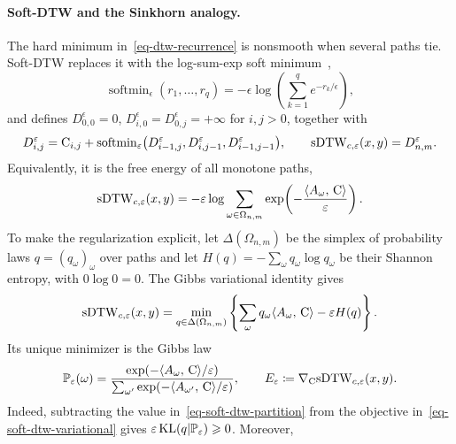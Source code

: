 \paragraph{Soft-DTW and the Sinkhorn analogy.}
The hard minimum in~\eqref{eq-dtw-recurrence} is nonsmooth when several paths tie. Soft-DTW replaces it with the log-sum-exp soft minimum~\cite{CuturiBlondel2017SoftDTW},
\begin{equation}\label{eq-dtw-softmin}
	\operatorname{softmin}_\epsilon(r_1,\ldots,r_q)
	=
	-\epsilon\log\!\left(\sum_{k=1}^q e^{-r_k/\epsilon}\right),
\end{equation}
and defines $D_{0,0}^\epsilon=0$, $D_{i,0}^\epsilon=D_{0,j}^\epsilon=+\infty$ for $i,j>0$, together with
\begin{equation}\label{eq-soft-dtw-recurrence}
	D_{i,j}^\varepsilon
	=
	\mathrm{C}_{i,j}
	+
	\operatorname{softmin}_\varepsilon
	\bigl(D_{i-1,j}^\varepsilon,D_{i,j-1}^\varepsilon,D_{i-1,j-1}^\varepsilon\bigr),
	\qquad
	\mathrm{sDTW}_{c,\varepsilon}(x,y)=D_{n,m}^\varepsilon.
\end{equation}
Equivalently, it is the free energy of all monotone paths,
\begin{equation}\label{eq-soft-dtw-partition}
	\mathrm{sDTW}_{c,\varepsilon}(x,y)
	=
	-\varepsilon\log
	\sum_{\omega\in\Omega_{n,m}}
	\exp\!\left(-\frac{\langle A_\omega,\,\mathrm{C}\rangle}{\varepsilon}\right).
\end{equation}
To make the regularization explicit, let $\Delta(\Omega_{n,m})$ be the simplex of probability laws $q=(q_\omega)_\omega$ over paths and let $H(q)=-\sum_\omega q_\omega\log q_\omega$ be their Shannon entropy, with $0\log0=0$. The Gibbs variational identity gives
\begin{equation}\label{eq-soft-dtw-variational}
	\mathrm{sDTW}_{c,\varepsilon}(x,y)
	=
	\min_{q\in\Delta(\Omega_{n,m})}
	\left\{
	\sum_{\omega}q_\omega\langle A_\omega,\,\mathrm{C}\rangle
	-\varepsilon H(q)
	\right\}.
\end{equation}
Its unique minimizer is the Gibbs law
\begin{equation}\label{eq-soft-dtw-gibbs-law}
	\mathbb{P}_\varepsilon(\omega)
	=
	\frac{\exp(-\langle A_\omega,\,\mathrm{C}\rangle/\varepsilon)}
	{\sum_{\omega'}\exp(-\langle A_{\omega'},\,\mathrm{C}\rangle/\varepsilon)},
	\qquad
	E_\varepsilon
	\coloneqq
	\nabla_{\mathrm{C}}\mathrm{sDTW}_{c,\varepsilon}(x,y).
\end{equation}
Indeed, subtracting the value in~\eqref{eq-soft-dtw-partition} from the objective in~\eqref{eq-soft-dtw-variational} gives $\varepsilon\operatorname{KL}(q|\mathbb{P}_\varepsilon)\geqslant0$. Moreover,
